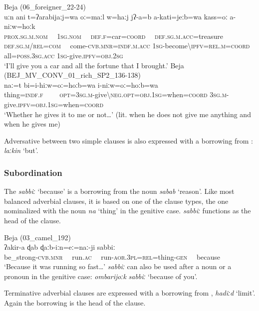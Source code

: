 \documentclass[output=paper]{langsci/langscibook}
\begin{document}
\ea\label{car}
{{Beja}{ (}{06\_foreigner\_22-24)}}\\
\gll uːn ani t=ʔarabijaːj=wa oː=maːl w=haːj jʔ-a=b a-kati=jeːb=wa kass=oː  a-niːw=hoːk\\
     \textsc{prox.sg.m.nom}~~	\textsc{1sg.nom}~~ \textsc{def.f=}car=\textsc{coord}~~ \textsc{def.sg.m.acc=}treasure \textsc{def.sg.m/rel=com}~~ come-\textsc{cvb.mnr=indf.m.acc} \textsc{1sg}-become\textsc{\textbackslash ipfv=rel.m=coord} all=\textsc{poss.3sg.acc} \textsc{1sg}-give.\textsc{ipfv=obj.2sg}\\
\glt `I’ll give you a car and all the fortune that I brought.'
\ex\label{thing}
{{Beja (}BEJ\_MV\_CONV\_01\_rich\_SP2\_136-138)}\\
\gll naː=t bi=i-hiːw=oː=hoːb=wa i-niːw=oː=hoːb=wa\\
     thing=\textsc{indf.f}~~~~ \textsc{opt=3sg.m-}give\textsc{\textbackslash neg.opt=obj.1sg}=when=\textsc{coord} \textsc{3sg.m-}give.\textsc{ipfv=obj.1sg}=when=\textsc{coord}\\
\glt `Whether he gives it to me or not…' (lit. when he does not give me anything and when he gives me)
\z

Adversative  between two simple clauses is also expressed with a borrowing from : \textit{laːkin} ‘but’.


 \subsubsection{Subordination}

The  \textit{sabbiː} ‘because’ is a borrowing from the  noun \textit{sabab} ‘reason’. Like most balanced adverbial clauses, it is based on one of the  clause types, the one nominalized with the noun \textit{na} ‘thing’ in the genitive case. \textit{sabbiː} functions as the head of the  clause.\pagebreak

\ea
{Beja ({03\_camel\_192)}}\\
\gll ʔakir-a ɖab ɖaːb-iːn=eː=naː-ji sabbiː\\
     be\_strong-\textsc{cvb.mnr}~~ run.\textsc{ac}~~ run-\textsc{aor.3pl=rel}=thing-\textsc{gen}~~ because\\
\glt `Because it was running so fast…'
\z
\textit{sabbiː} can also be used after a noun or a pronoun in the genitive case: \textit{ombarijoːk} \textit{sabbiː} ‘because of you’.

Terminative adverbial clauses are expressed with a borrowing from , \textit{hadiːd} ‘limit’. Again the borrowing is the head of the  clause.
\end{document}
